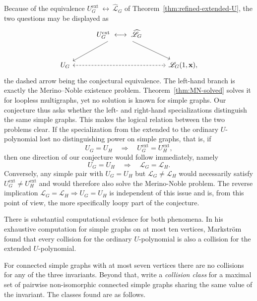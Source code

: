 \documentclass[11pt]{article}
\theoremstyle{plain}
\theoremstyle{definition}
\renewcommand{\mathcal}{\mathscr}
\newcommand{\LL}{\mathcal{L}}    %
\newcommand{\bx}{\mathbf{x}}
\newcommand{\ext}{\mathrm{ext}}
\numberwithin{equation}{section}
\begin{document}
Because of the equivalence
  $ U_G^{\ext} \ \longleftrightarrow\ \widehat{\LL}_G $
of Theorem~\ref{thm:refined-extended-U}, the two questions may be displayed as
\[
\begin{tikzcd}[column sep=3em, row sep=2.6em]
  & U_G^{\ext}\ \longleftrightarrow\ \widehat{\LL}_G
      \arrow[dl] \arrow[dr] & \\
  U_G \arrow[rr, dashed, leftrightarrow] & & \LL_G(1,\bx),
\end{tikzcd}
\]
the dashed arrow being the conjectural equivalence.
The left-hand branch is exactly the Merino--Noble existence problem.
Theorem~\ref{thm:MN-solved} solves it for loopless multigraphs, yet no
solution is known for simple graphs.  Our conjecture thus asks whether the left-
and right-hand specializations distinguish the same simple graphs.
%
This makes the logical relation between the two problems clear.
If the specialization from the extended to the ordinary $U$-polynomial lost
no distinguishing power on simple graphs, that is, if
\[
   U_G=U_H\quad\Longrightarrow\quad
   U_G^{\ext}=U_H^{\ext},
\]
then one direction of our conjecture would follow immediately, namely
\[
   U_G=U_H\quad\Longrightarrow\quad \LL_G=\LL_H.
\]
Conversely, any simple pair with $U_G=U_H$ but $\LL_G\ne\LL_H$ would necessarily satisfy
$U_G^{\ext}\ne U_H^{\ext}$ and would therefore also solve the
Merino-Noble problem.  The reverse implication $\LL_G=\LL_H\Rightarrow U_G=U_H$
is independent of this issue and is, from this point of view,
the more specifically loopy part of the conjecture.

There is substantial computational evidence for both phenomena.
In his exhaustive computation for simple graphs on at most ten vertices,
Markstr\"om~\cite{Mar} found that every collision for the ordinary
$U$-polynomial is also a collision for the extended $U$-polynomial.

For connected simple graphs with at most seven vertices there are no
collisions for any of the three invariants.  Beyond that, write a
\emph{collision class} for a maximal set of pairwise non-isomorphic connected
simple graphs sharing the same value of the invariant.
The classes found are as follows.
\end{document}
